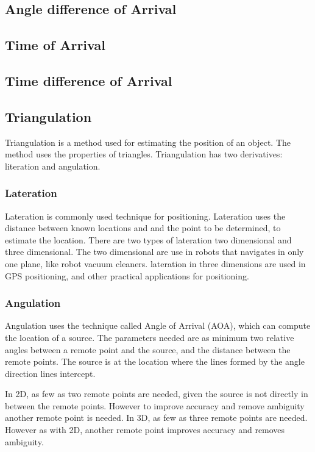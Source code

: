   \subsection{Angle difference of Arrival}

  \subsection{Time of Arrival}

  \subsection{Time difference of Arrival}

  \subsection{Triangulation}

  Triangulation is a method used for estimating the position of an object. The method uses the properties of triangles. Triangulation has two derivatives: literation and angulation.

 \subsubsection{Lateration}

  Lateration is commonly used technique for positioning.  Lateration uses the distance between known locations and and the point to be determined, to estimate the location.\cite{tri_lateration}  There are two types of lateration two dimensional and three dimensional. The two dimensional are use in robots that navigates in only one plane, like robot vacuum cleaners. 
  lateration in three dimensions are used in GPS positioning, and other practical applications for positioning.
  


  \subsubsection{Angulation}

  Angulation uses the technique called Angle of Arrival (AOA), which can compute the location of a source. The parameters needed are as minimum two relative angles between a remote point and the source, and the distance between the remote points. The source is at the location where the lines formed by the angle direction lines intercept. 

  In 2D, as few as two remote points are needed, given the source is not directly in between the remote points. However to improve accuracy and remove ambiguity  another remote point is needed. In 3D, as few as three remote points are needed. However as with 2D, another remote point improves accuracy and removes ambiguity. \cite{Liu2007, Sun2009, Boontrai2009}

